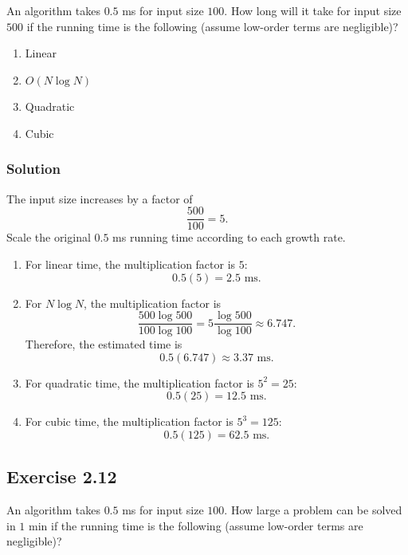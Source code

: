 \documentclass[12pt,a4paper]{article}
\begin{document}
\noindent
An algorithm takes $0.5$ ms for input size $100$. How long will it take
for input size $500$ if the running time is the following (assume
low-order terms are negligible)?

\begin{enumerate}
  \renewcommand{\labelenumi}{\alph{enumi}.}
  \item Linear
  \item $O(N\log N)$
  \item Quadratic
  \item Cubic
\end{enumerate}

\subsubsection*{\color{sectionnavy}Solution}

The input size increases by a factor of
\[
\frac{500}{100}=5.
\]
Scale the original $0.5$ ms running time according to each growth rate.

\begin{enumerate}
  \renewcommand{\labelenumi}{\alph{enumi}.}

  \item For linear time, the multiplication factor is $5$:
  \[
  0.5(5)=\boxed{2.5\text{ ms}}.
  \]

  \item For $N\log N$, the multiplication factor is
  \[
  \frac{500\log 500}{100\log 100}
  =5\frac{\log 500}{\log 100}
  \approx 6.747.
  \]
  Therefore, the estimated time is
  \[
  0.5(6.747)\approx\boxed{3.37\text{ ms}}.
  \]

  \item For quadratic time, the multiplication factor is $5^2=25$:
  \[
  0.5(25)=\boxed{12.5\text{ ms}}.
  \]

  \item For cubic time, the multiplication factor is $5^3=125$:
  \[
  0.5(125)=\boxed{62.5\text{ ms}}.
  \]
\end{enumerate}

\subsection*{\color{sectionnavy}Exercise 2.12}

\noindent
An algorithm takes $0.5$ ms for input size $100$. How large a problem
can be solved in $1$ min if the running time is the following (assume
low-order terms are negligible)?
\end{document}
